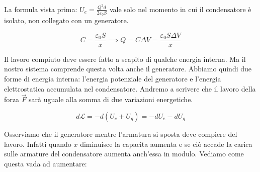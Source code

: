 \begin{figure}[htpb]
\end{figure}
\FloatBarrier

La formula vista prima: $U_e = \frac{Q^2 d}{2\varepsilon_0 S}$ vale solo nel momento in cui il condensatore è isolato, non collegato con un generatore.

\[
	C=\frac{\varepsilon_0 S}{x} \implies Q=C\Delta V=\frac{\varepsilon_0 S \Delta V}{x}
\]

Il lavoro compiuto deve essere fatto a scapito di qualche energia interna. Ma il nostro sistema comprende questa volta anche il generatore.
Abbiamo quindi due forme di energia interna: l'energia potenziale del generatore e l'energia elettrostatica accumulata nel condensatore. Andremo a scrivere che il lavoro della forza $\vec{F}$ sarà uguale alla somma di due variazioni energetiche.

\[
	\boxed{d\mathcal{L} = -d(U_e+U_g)} = -dU_e - dU_g
\]

Osserviamo che il generatore mentre l'armatura si sposta deve compiere del lavoro. Infatti quando $x$ diminuisce la capacita aumenta e se ciò accade la carica sulle armature del condensatore aumenta anch'essa in modulo. Vediamo come questa vada ad aumentare:

